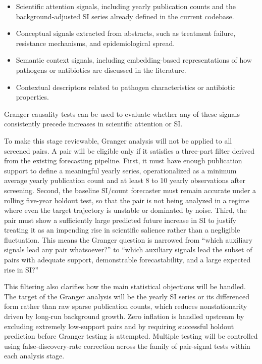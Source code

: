 \documentclass[
]{article}
\providecommand{\tightlist}{%
  \setlength{\itemsep}{0pt}\setlength{\parskip}{0pt}}
\begin{document}
\begin{itemize}
\tightlist
\item
  Scientific attention signals, including yearly publication counts and
  the background-adjusted SI series already defined in the current
  codebase.
\item
  Conceptual signals extracted from abstracts, such as treatment
  failure, resistance mechanisms, and epidemiological spread.
\item
  Semantic context signals, including embedding-based representations of
  how pathogens or antibiotics are discussed in the literature.
\item
  Contextual descriptors related to pathogen characteristics or
  antibiotic properties.
\end{itemize}

Granger causality tests can be used to evaluate whether any of these
signals consistently precede increases in scientific attention or SI.

To make this stage reviewable, Granger analysis will not be applied to
all screened pairs. A pair will be eligible only if it satisfies a
three-part filter derived from the existing forecasting pipeline.
First, it must have enough publication support to define a meaningful
yearly series, operationalized as a minimum average yearly publication
count and at least 8 to 10 yearly observations after screening.
Second, the baseline SI/count forecaster must remain accurate under a
rolling five-year holdout test, so that the pair is not being analyzed
in a regime where even the target trajectory is unstable or dominated by
noise. Third, the pair must show a sufficiently large predicted future
increase in SI to justify treating it as an impending rise in
scientific salience rather than a negligible fluctuation. This means the
Granger question is narrowed from ``which auxiliary signals lead any
pair whatsoever?'' to ``which auxiliary signals lead the subset of
pairs with adequate support, demonstrable forecastability, and a large
expected rise in SI?''

This filtering also clarifies how the main statistical objections will
be handled. The target of the Granger analysis will be the yearly SI
series or its differenced form rather than raw sparse publication
counts, which reduces nonstationarity driven by long-run background
growth. Zero inflation is handled upstream by excluding extremely
low-support pairs and by requiring successful holdout prediction before
Granger testing is attempted. Multiple testing will be controlled using
false-discovery-rate correction across the family of pair-signal tests
within each analysis stage.
\end{document}
